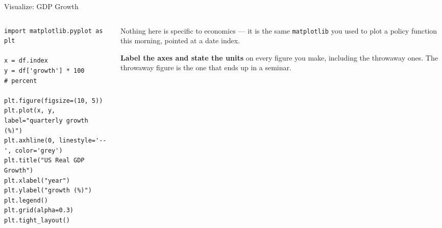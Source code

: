 \begin{frame}[fragile]{Visualize: GDP Growth}
\begin{columns}[T]
\begin{column}{0.53\textwidth}
\begin{lstlisting}
import matplotlib.pyplot as plt

x = df.index
y = df['growth'] * 100          # percent

plt.figure(figsize=(10, 5))
plt.plot(x, y, label="quarterly growth (%)")
plt.axhline(0, linestyle='--', color='grey')
plt.title("US Real GDP Growth")
plt.xlabel("year")
plt.ylabel("growth (%)")
plt.legend()
plt.grid(alpha=0.3)
plt.tight_layout()
\end{lstlisting}
\end{column}
\begin{column}{0.44\textwidth}
\small
Nothing here is specific to economics --- it is the same \texttt{matplotlib} you used to plot a policy function this morning, pointed at a date index.
\medskip
\begin{takeawaybox}\footnotesize
\textbf{Label the axes and state the units} on every figure you make, including the throwaway ones. The throwaway figure is the one that ends up in a seminar.
\end{takeawaybox}
\end{column}
\end{columns}
\vspace{1mm}
\end{frame}

